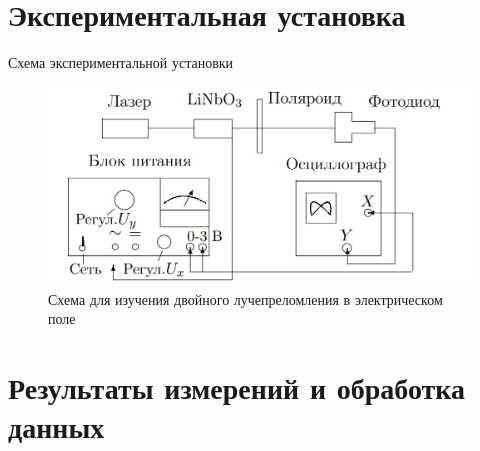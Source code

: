 \documentclass[11pt]{beamer} %
\begin{document}
    \section{Экспериментальная установка}

    \begin{frame}{Схема экспериментальной установки}
        \begin{figure}
            \centering
            \includegraphics[width = \textwidth]{images/2.jpg}
            \caption{Схема для изучения двойного лучепреломления в электрическом поле}
            \label{installation}
        \end{figure}
    \end{frame}

\section{Результаты измерений и обработка данных}
\end{document}
